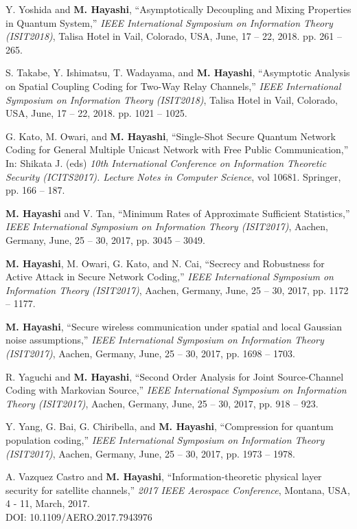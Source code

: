 \documentclass[a4paper,12pt,oneside]{article}
\begin{document}
\begin{enumerate}
Y. Yoshida and \textbf{M. Hayashi},
``Asymptotically Decoupling and Mixing Properties in Quantum System,''
{\em IEEE International Symposium on Information Theory (ISIT2018)}, 
 Talisa Hotel in Vail, Colorado, USA, June, 17 -- 22, 2018.
pp. 261 -- 265.
 
S. Takabe,
Y. Ishimatsu,
T. Wadayama, and \textbf{M. Hayashi},
``Asymptotic Analysis on Spatial Coupling Coding for Two-Way Relay Channels,''
{\em IEEE International Symposium on Information Theory (ISIT2018)}, 
 Talisa Hotel in Vail, Colorado, USA, June, 17 -- 22, 2018.
pp. 1021 -- 1025.


G. Kato, M. Owari, and \textbf{M. Hayashi},
``Single-Shot Secure Quantum Network Coding
for General Multiple Unicast Network with Free
Public Communication,''
In: Shikata J. (eds) 
{\em 10th International Conference on Information Theoretic Security (ICITS2017). 
Lecture Notes in Computer Science},
 vol 10681. Springer,  pp. 166 -- 187.

\textbf{M. Hayashi} and V. Tan,
``Minimum Rates of Approximate Sufficient Statistics,''
{\em IEEE International Symposium on Information Theory (ISIT2017)}, 
Aachen, Germany, June, 25 -- 30, 2017, pp. 3045 -- 3049.

\textbf{M. Hayashi}, M. Owari, G. Kato, and N. Cai,
``Secrecy and Robustness for Active Attack in Secure Network Coding,''
{\em IEEE International Symposium on Information Theory (ISIT2017)}, 
Aachen, Germany, June, 25 -- 30, 2017, pp. 1172 -- 1177.

\textbf{M. Hayashi},
``Secure wireless communication under spatial and local Gaussian noise assumptions,''
{\em IEEE International Symposium on Information Theory (ISIT2017)}, 
Aachen, Germany, June, 25 -- 30, 2017, pp. 1698 -- 1703.

R. Yaguchi and \textbf{M. Hayashi},
``Second Order Analysis for Joint Source-Channel Coding with Markovian Source,''
{\em IEEE International Symposium on Information Theory (ISIT2017)}, 
Aachen, Germany, June, 25 -- 30, 2017, pp. 918 -- 923.

Y. Yang, G. Bai, G. Chiribella, and \textbf{M. Hayashi},
``Compression for quantum population coding,''
{\em IEEE International Symposium on Information Theory (ISIT2017)}, 
Aachen, Germany, June, 25 -- 30, 2017, pp. 1973 -- 1978.

A. Vazquez Castro and \textbf{M. Hayashi}, ``Information-theoretic physical layer security for satellite channels,'' 
{\em 2017 IEEE Aerospace Conference}, Montana, USA, 4 - 11, March, 2017.\\
DOI: 10.1109/AERO.2017.7943976


\end{enumerate}
\end{document}
